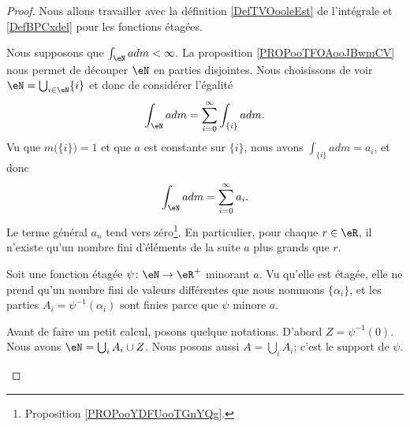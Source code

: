 \begin{proof}
    Nous allons travailler avec la définition \ref{DefTVOooleEst} de l'intégrale et \ref{DefBPCxdel} pour les fonctions étagées.

    \begin{subproof}
        Nous supposons que \( \int_{\eN}adm<\infty\). La proposition \ref{PROPooTFOAooJBwmCV} nous permet de découper \( \eN\) en parties disjointes. Nous choisissons de voir \( \eN=\bigcup_{i\in \eN}\{ i \}\) et donc de considérer l'égalité
        \begin{equation}
            \int_{\eN}adm=\sum_{i=0}^{\infty}\int_{\{ i \}}adm.
        \end{equation}
        Vu que \( m\big( \{ i \} \big)=1\) et que \( a\) est constante sur \( \{ i \}\), nous avons \( \int_{\{ i \}}adm=a_i\), et donc
        \begin{equation}        
            \int_{\eN}adm=\sum_{i=0}^{\infty}a_i.
        \end{equation}
        Le terme général \( a_n\) tend vers zéro\footnote{Proposition \ref{PROPooYDFUooTGnYQg}.}. En particulier, pour chaque \( r\in \eR\), il n'existe qu'un nombre fini d'éléments de la suite \( a\) plus grands que \( r\).

        Soit une fonction étagée \( \psi\colon \eN\to \eR^+\) minorant \( a\). Vu qu'elle est étagée, elle ne prend qu'un nombre fini de valeurs différentes que nous nommons \( \{ \alpha_i \}\), et les parties \( A_i=\psi^{-1}(\alpha_i)\) sont finies parce que \( \psi\) minore \( a\).

        Avant de faire un petit calcul, posons quelque notations. D'abord \( Z=\psi^{-1}(0)\). Nous avons \( \eN=\bigcup_{i}A_i \cup Z\). Nous posons aussi \( A=\bigcup_iA_i\); c'est le support de \( \psi\).


\end{subproof}
\end{proof}
